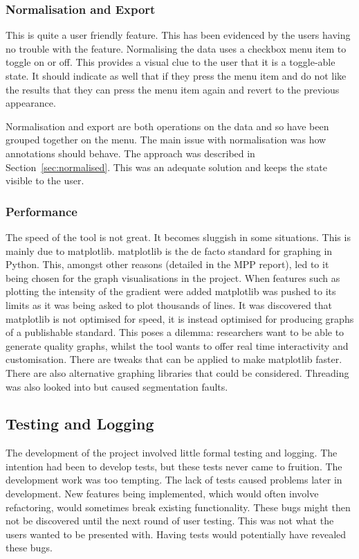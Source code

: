 \subsubsection{Normalisation and Export}

This is quite a user friendly feature.  This has been evidenced by the users having no trouble with the feature.  Normalising the data uses a checkbox menu item to toggle on or off.  This provides a visual clue to the user that it is a toggle-able state.  It should indicate as well that if they press the menu item and do not like the results that they can press the menu item again and revert to the previous appearance.

Normalisation and export are both operations on the data and so have been grouped together on the menu.  The main issue with normalisation was how annotations should behave.  The approach was described in Section~\ref{sec:normalised}.  This was an adequate solution and keeps the state visible to the user.

\subsubsection{Performance}

The speed of the tool is not great.  It becomes sluggish in some situations.  This is mainly due to matplotlib.  matplotlib is the de facto standard for graphing in Python. This, amongst other reasons (detailed in the MPP report), led to it being chosen for the graph visualisations in the project.  When features such as plotting the intensity of the gradient were added matplotlib was pushed to its limits as it was being asked to plot thousands of lines.  It was discovered that matplotlib is not optimised for speed, it is instead optimised for producing graphs of a publishable standard.  This poses a dilemma: researchers want to be able to generate quality graphs, whilst the tool wants to offer real time interactivity and customisation.  There are tweaks that can be applied to make matplotlib faster. There are also alternative graphing libraries that could be considered.  Threading was also looked into but caused segmentation faults.

\subsection{Testing and Logging}

The development of the project involved little formal testing and logging.  The intention had been to develop tests, but these tests never came to fruition.  The development work was too tempting. The lack of tests caused problems later in development.  New features being implemented, which would often involve refactoring, would sometimes break existing functionality.  These bugs might then not be discovered until the next round of user testing.  This was not what the users wanted to be presented with.  Having tests would potentially have revealed these bugs.

